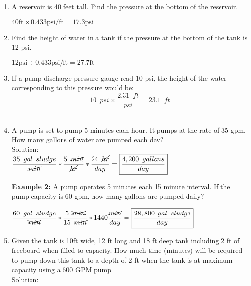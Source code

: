 \begin{enumerate}[1.]
\item A reservoir is 40 feet tall. Find the pressure at the bottom of the reservoir.

$40 \mathrm{ft} \times 0.433 \mathrm{psi} / \mathrm{ft}=17.3 \mathrm{psi}$

\vspace{0.4cm}

\item Find the height of water in a tank if the pressure at the bottom of the tank is 12 psi.

$12 \mathrm{psi} \div 0.433 \mathrm{psi} / \mathrm{ft}=27.7 \mathrm{ft}$

\vspace{0.4cm}

\item If a pump discharge pressure gauge read 10 psi, the height of the water corresponding to this pressure would be:
$$10 \enspace psi \times \dfrac{2.31 \enspace ft}{psi}=23.1 \enspace ft$$\\
\vspace{0.4cm}

\item A pump is set to pump 5 minutes each hour. It pumps at the rate of 35 gpm. How many gallons of water are pumped each day?\\
Solution:\\
$\dfrac{35 \enspace gal \enspace sludge}{\cancel{min}}*\dfrac{5 \enspace \cancel{min}}{\cancel{hr}} *\dfrac{24 \enspace \cancel{hr}}{day}=\boxed{\dfrac{4,200 \enspace gallons}{day}}$\\
\vspace{0.5cm}

\textbf{Example 2:}  A pump operates 5 minutes each 15 minute interval.  If the pump capacity is 60 gpm, how many gallons are pumped daily?

$\dfrac{60 \enspace gal \enspace sludge}{\xcancel{min}}*\dfrac{5 \enspace \xcancel{min}}{15 \enspace \cancel{min}}*1440\dfrac{\cancel{min}}{day}=\boxed{\dfrac {28,800 \enspace gal \enspace sludge }{day}}$\\
\vspace{0.5cm}

\item Given the tank is 10ft wide, 12 ft long and 18 ft deep tank including 2 ft of freeboard when filled to capacity. How much time (minutes) will be required to pump down this tank to a depth of 2 ft when the tank is at maximum capacity using a 600 GPM pump\\
Solution:\\
\vspace{0.5cm}



\end{enumerate}
